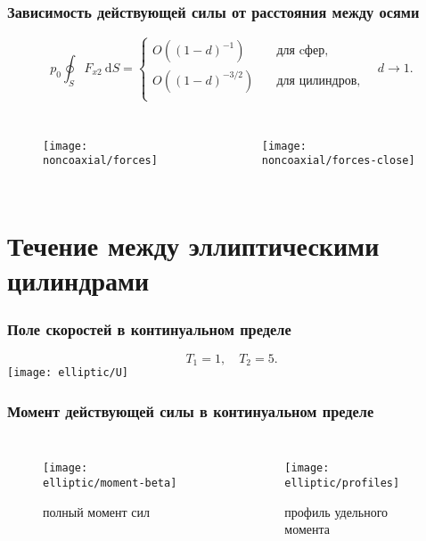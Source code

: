 \documentclass[mathserif]{beamer} %
\newcommand{\dd}{\:\mathrm{d}}
\newcommand{\OO}[1]{O(#1)}
\begin{document}
\begin{frame}
    \frametitle{Зависимость действующей силы от расстояния между осями}
    \vspace{-.5cm}
    \[ p_0 \oint_S F_{x2}\dd{S} = \begin{cases}
        \OO{(1-d)^{-1}} & \quad\text{для cфер}, \\
        \OO{(1-d)^{-3/2}} & \quad\text{для цилиндров}, \\
        \end{cases} \quad d\to1. \]
    \vspace{-.7cm}
    \begin{columns}
        \begin{figure}
            \texttt{[image: noncoaxial/forces]}
        \end{figure}
        \begin{figure}
            \texttt{[image: noncoaxial/forces-close]}
        \end{figure}
    \end{columns}
\end{frame}

\section{Течение между эллиптическими цилиндрами}

\begin{frame}
    \frametitle{Поле скоростей в континуальном пределе}
    \[ T_1 = 1, \quad T_2 = 5.\]
    \centering
    \hspace{-1cm}
    \texttt{[image: elliptic/U]}
    \hspace{-1cm}
\end{frame}

\begin{frame}
    \frametitle{Момент действующей силы в континуальном пределе}
    \begin{columns}
        \begin{figure}
            \texttt{[image: elliptic/moment-beta]}
            \caption{полный момент сил}
        \end{figure}
        \begin{figure}
            \texttt{[image: elliptic/profiles]}
            \caption{профиль удельного момента}
        \end{figure}
    \end{columns}
\end{frame}
\end{document}
